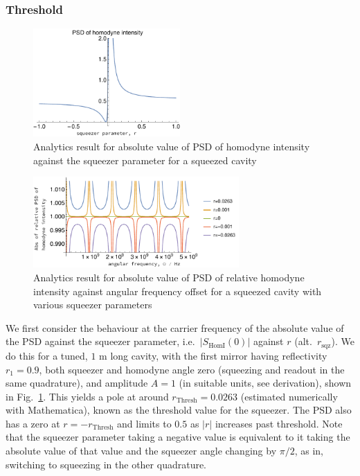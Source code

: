 \documentclass[aps,pra,superscriptaddress,reprint,nofootinbib]{revtex4-1}
\newcommand{\abs}[1]{\left\lvert #1 \right\rvert}
\begin{document}
\subsubsection{Threshold}

\begin{figure}
	\begin{center}
	\includegraphics[width=0.5\textwidth]{figures/not_main_PSD_vs_r.pdf}
	\end{center}
	\caption{Analytics result for absolute value of PSD of homodyne intensity against the squeezer parameter for a squeezed cavity}
	\label{fig:not_main_PSD_vs_r}
\end{figure}

\begin{figure}
	\begin{center}
	\includegraphics[width=0.7\textwidth]{figures/not_main_PSD_vs_freq.pdf}
	\end{center}
	\caption{Analytics result for absolute value of PSD of relative homodyne intensity against angular frequency offset for a squeezed cavity with various squeezer parameters}
	\label{fig:not_main_PSD_vs_freq}
\end{figure}

We first consider the behaviour at the carrier frequency of the absolute value of the PSD against the squeezer parameter, i.e.\ $\abs{S_{\mathrm{HomI}}(0)}$ against $r$ (alt.\ $r_\mathrm{sqz}$). We do this for a tuned, $1$ m long cavity, with the first mirror having reflectivity $r_1 = 0.9$, both squeezer and homodyne angle zero (squeezing and readout in the same quadrature), and amplitude $A = 1$ (in suitable units, see derivation), shown in Fig.~\ref{fig:not_main_PSD_vs_r}. This yields a pole at around $r_\mathrm{Thresh} = 0.0263$ (estimated numerically with Mathematica), known as the threshold value for the squeezer. The PSD also has a zero at $r = -r_\mathrm{Thresh}$ and limits to $0.5$ as $\abs{r}$ increases past threshold. Note that the squeezer parameter taking a negative value is equivalent to it taking the absolute value of that value and the squeezer angle changing by $\pi/2$, as in, switching to squeezing in the other quadrature.
\end{document}
